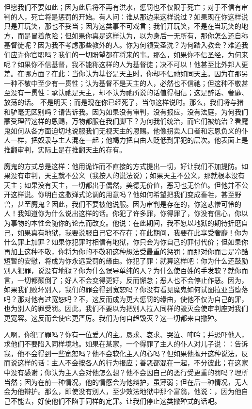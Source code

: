 但愿我们不要如此；因为此后将不再有洪水，惩罚也不仅限于死亡；对于不信有审判的人，死亡将是惩罚的开始。有人问：谁从那边来这样说过？如果现在你这样说只是开玩笑，那也不妥当；因为这类事不可戏言；我们开玩笑，不是在当玩笑的地方，而是冒着危险；但如果你真是这样认为，以为身后一无所有，那你怎么还自称基督徒呢？因为我不考虑那些教外的人。你为何领受圣洗？为何踏入教会？难道我们应许你官职吗？我们的一切盼望都在将来的事。那么，如果你不信圣经，为何来呢？如果你不信基督，我不能称这样的人为基督徒；决不可以！他甚至比外邦人更差。在哪方面？在此：当你认为基督是天主时，你却不信祂如同天主。因为在那另一种不敬中至少有一贯性；认为基督不是天主的人，必然也不信祂；但这种不敬甚至没有一贯性：承认祂是天主，却不认为祂所说的话值得相信；这是醉话、奢靡、放荡的话。 不是明天；而是现在你已经死了，当你这样说时。那么，我们将与猪和驴毫无区别吗？请告诉我。因为如果没有审判，没有报应，没有法庭，为何我们蒙受理智这样的恩赐，万物都服在我们脚下？为何我们统治，而它们被统治？看魔鬼如何从各方面迫切地说服我们无视天主的恩赐。他像拐卖人口者和忘恩负义的仆人一样，把奴隶与主人混在一起；他竭力把自由人贬低到罪犯的层次。他表面上是推翻审判，实际上是在推翻天主的存有。\par

魔鬼的方式总是这样：他用诡诈而不直接的方式提出一切，好让我们不加提防。如果没有审判，天主就不公义（我按人的说法说）；如果天主不公义，那就根本没有天主；如果没有天主，一切都出于偶然，美德无价值，恶习也无价值。但他并不公开这样说。你明白这撒殚式论调的用意吗？他如何希望把我们变成畜牲，甚至野兽，甚至魔鬼？因此，我们不要被他说服。因为审判是存在的，你这悲惨可怜的人！我知道你为什么说出这样的话。你犯了许多罪，你得罪了，你没有信心，你以为事物的本性会随你的论点而改变。他说：在此期间，我不愿以地狱的期待折磨自己，如果真有地狱，我要说服自己它不存在；在此期间，我要在此享受奢靡！你为什么罪上加罪？如果你犯罪时相信有地狱，你只会为你自己的罪付代价；但如果你再加上这种不敬，你将为你的不敬和这种想法受最重的惩罚；而那对你而言是冷酷短暂的安慰，将成为你永远受罚的缘由。你犯了罪：就算这样吧：你为什么还鼓励别人犯罪，说没有地狱？你为什么误导单纯的人？为什么使百姓的手发软？就你而言，一切都颠倒了；好人不会变得更好，反而懈怠；恶人也不会停止作恶。因为，如果我们败坏别人，我们的罪会得到宽恕吗？你没有看见魔鬼如何试图拉亚当堕落吗？那对他有过宽恕吗？不，这反而成为更大惩罚的缘由，使他不仅为自己的罪，也为别人的罪受罚。因此，我们不要以为把别人拉入同样的毁灭会使审判座对我们更宽容。这反而会使它更严厉。我们为何自趋毁灭？这一切都来自撒殚。\par

人啊，你犯了罪吗？你有一位爱人的主。恳求、哀求、哭泣、呻吟；并恐吓他人，求他们不要陷入同样境地。如果在某家，一个得罪了主人的仆人对儿子说：：告诉我，他不会得到一些宽恕吗？他不会软化主人的心吗？但如果他抛开这种说法，反而说这样的话：主人不会按各人的行为报应；善恶都混在一起，不分彼此；在这家中没有感谢；你认为主人会对他怎么想？他不会因自己的恶行受更重的罚吗？理所当然；因为在前一种情况，他的情感会为他辩护，虽薄弱；但在后一种情况，无人会为他辩护。那么，即使没有别人，至少效法地狱中那个富翁，他说：，因为他自己不能去，好使他们不陷于同样的定罪。让我们停止这类撒殚式的话吧。\par

